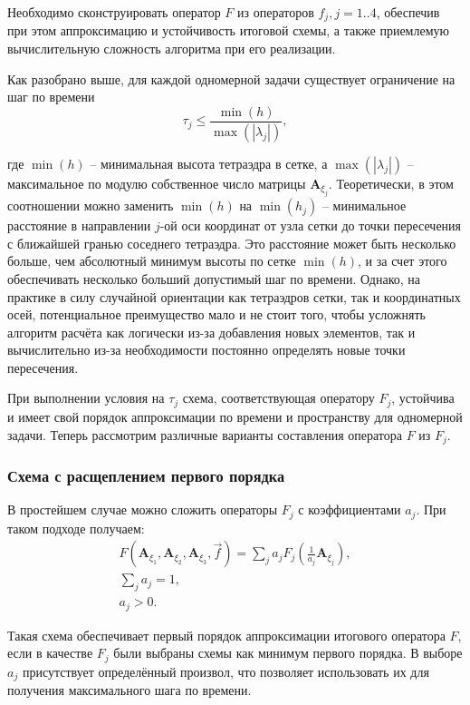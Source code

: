 Необходимо сконструировать оператор $F$ из операторов $f_j, j=1..4$, обеспечив при этом аппроксимацию и устойчивость итоговой схемы, а также приемлемую вычислительную сложность алгоритма при его реализации.

Как разобрано выше, для каждой одномерной задачи существует ограничение на шаг по времени
\begin{equation}
\tau_j \le \frac{\min(h)}{\max(|\lambda_j|)},
\end{equation}

где $\min(h)$ -- минимальная высота тетраэдра в сетке, а $\max(|\lambda_j|)$ -- максимальное по модулю собственное число матрицы $\mathbf A_{\xi_j}$. Теоретически, в этом соотношении можно заменить $\min(h)$ на $\min(h_j)$ -- минимальное расстояние в направлении $j$-ой оси координат от узла сетки до точки пересечения с ближайшей гранью соседнего тетраэдра. Это расстояние может быть несколько больше, чем абсолютный минимум высоты по сетке $\min(h)$, и за счет этого обеспечивать несколько больший допустимый шаг по времени. Однако, на практике в силу случайной ориентации как тетраэдров сетки, так и координатных осей, потенциальное преимущество мало и не стоит того, чтобы усложнять алгоритм расчёта как логически из-за добавления новых элементов, так и вычислительно из-за необходимости постоянно определять новые точки пересечения.

При выполнении условия на $\tau_j$ схема, соответствующая оператору $F_j$, устойчива и имеет свой порядок аппроксимации по времени и пространству для одномерной задачи. Теперь рассмотрим различные варианты составления оператора $F$ из $F_j$.


\subsubsection{Схема с расщеплением первого порядка}

В простейшем случае можно сложить операторы $F_j$ с коэффициентами $a_j$. При таком подходе получаем:
\begin{eqnarray}
F(\mathbf A_{\xi_1}, \mathbf A_{\xi_2}, \mathbf A_{\xi_3}, \vec f) = \sum\limits_{j} a_j F_j(\frac{1}{a_j} \mathbf A_{\xi_j}), \nonumber\\
\sum\limits_{j} a_j = 1, \nonumber\\
a_j > 0.
\end{eqnarray}

Такая схема обеспечивает первый порядок аппроксимации итогового оператора $F$, если в качестве $F_j$ были выбраны схемы как минимум первого порядка. В выборе $a_j$ присутствует определённый произвол, что позволяет использовать их для получения максимального шага по времени.

